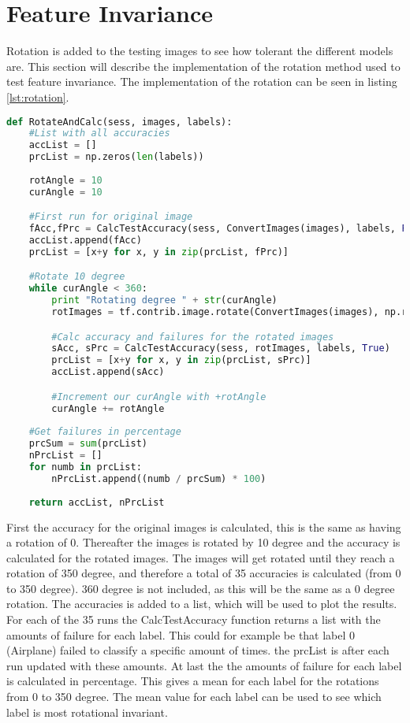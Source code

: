 \section{Feature Invariance}

Rotation is added to the testing images to see how tolerant the different models are. This section will describe the implementation of the rotation method used to test feature invariance. The implementation of the rotation can be seen in listing \ref{lst:rotation}.

\begin{lstlisting}[language=Python, label=lst:rotation, caption=Rotate the images and calculate the accuracy]
def RotateAndCalc(sess, images, labels):
    #List with all accuracies
    accList = []
    prcList = np.zeros(len(labels))
    
    rotAngle = 10
    curAngle = 10

    #First run for original image
    fAcc,fPrc = CalcTestAccuracy(sess, ConvertImages(images), labels, False)
    accList.append(fAcc)
    prcList = [x+y for x, y in zip(prcList, fPrc)]

    #Rotate 10 degree
    while curAngle < 360:
        print "Rotating degree " + str(curAngle)
        rotImages = tf.contrib.image.rotate(ConvertImages(images), np.radians(curAngle))

        #Calc accuracy and failures for the rotated images
        sAcc, sPrc = CalcTestAccuracy(sess, rotImages, labels, True)
        prcList = [x+y for x, y in zip(prcList, sPrc)]
        accList.append(sAcc)

        #Increment our curAngle with +rotAngle
        curAngle += rotAngle
       
    #Get failures in percentage
    prcSum = sum(prcList)
    nPrcList = []
    for numb in prcList:
        nPrcList.append((numb / prcSum) * 100)
    
    return accList, nPrcList
\end{lstlisting}

First the accuracy for the original images is calculated, this is the same as having a rotation of 0. Thereafter the images is rotated by 10 degree and the accuracy is calculated for the rotated images. The images will get rotated until they reach a rotation of 350 degree, and therefore a total of 35 accuracies is calculated (from 0 to 350 degree). 360 degree is not included, as this will be the same as a 0 degree rotation. The accuracies is added to a list, which will be used to plot the results. For each of the 35 runs the CalcTestAccuracy function returns a list with the amounts of failure for each label. This could for example be that label 0 (Airplane) failed to classify a specific amount of times. the prcList is after each run updated with these amounts. At last the the amounts of failure for each label is calculated in percentage. This gives a mean for each label for the rotations from 0 to 350 degree. The mean value for each label can be used to see which label is most rotational invariant.
\newline


